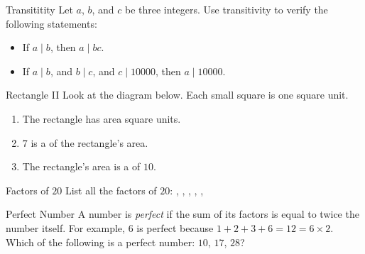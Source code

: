 \documentclass[12pt,letterpaper]{article}
\begin{document}
\begin{problem}{Transititity}
 Let $a$, $b$, and $c$ be three integers. Use transitivity to verify the
 following statements:
 \begin{itemize}
  \item If $a \mid b$, then $a \mid bc$.
  \item If $a \mid b$, and $b \mid c$, and $c \mid 10000$, then $a \mid 10000$.
 \end{itemize}
\end{problem}

\begin{problem}{Rectangle II}
 Look at the diagram below. Each small square is one square unit.

 \begin{center}
 \end{center}

 \begin{enumerate}
  \item The rectangle has area \underline{\hspace{4em}} square units.
  \item $7$ is a \underline{\hspace{10em}} of the rectangle's area.
  \item The rectangle's area is a \underline{\hspace{10em}} of $10$.
 \end{enumerate}
\end{problem}

\begin{problem}{Factors of $20$}
 List all the factors of $20$:
 \underline{\hspace{2em}}, \underline{\hspace{2em}},
 \underline{\hspace{2em}}, \underline{\hspace{2em}},
 \underline{\hspace{2em}}, \underline{\hspace{2em}}
\end{problem}

\begin{problem}{Perfect Number}
 A number is \emph{perfect} if the sum of its factors is equal to twice the
 number itself. For example, $6$ is perfect because $1+2+3+6=12=6\times2$. Which
 of the following is a perfect number: $10$, $17$, $28$?
\end{problem}
\end{document}
